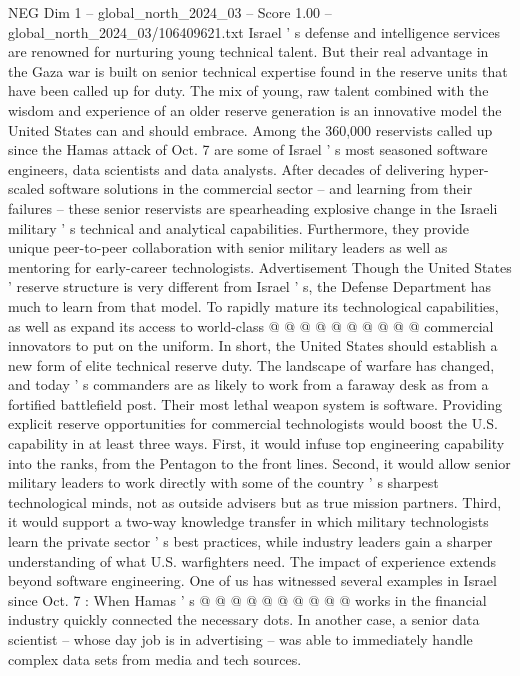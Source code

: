 \begin{textsample}{NEG Dim 1 – global\_north\_2024\_03 – Score 1.00 – global\_north\_2024\_03/106409621.txt}  \label{ex:f1_neg_394}
Israel ' s defense and intelligence services are renowned for nurturing young technical talent.
But their real advantage in the Gaza war is built on senior technical expertise found in the reserve units that have been called up for duty.
The mix of young, raw talent combined with the wisdom and experience of an older reserve generation is an innovative model the United States can and should embrace.
Among the 360,000 reservists called up since the Hamas attack of Oct. 7 are some of Israel ' s most seasoned software engineers, data scientists and data analysts.
After decades of delivering hyper-scaled software solutions in the commercial sector -- and learning from their failures -- these senior reservists are spearheading explosive change in the Israeli military ' s technical and analytical capabilities.
Furthermore, they provide unique peer-to-peer collaboration with senior military leaders as well as mentoring for early-career technologists.
Advertisement Though the United States ' reserve structure is very different from Israel ' s, the Defense Department has much to learn from that model.
To rapidly mature its technological capabilities, as well as expand its access to world-class @ @ @ @ @ @ @ @ @ @ commercial innovators to put on the uniform.
In short, the United States should establish a new form of elite technical reserve duty.
The landscape of warfare has changed, and today ' s commanders are as likely to work from a faraway desk as from a fortified battlefield post.
Their most lethal weapon system is software.
Providing explicit reserve opportunities for commercial technologists would boost the U.S. capability in at least three ways.
First, it would infuse top engineering capability into the ranks, from the Pentagon to the front lines.
Second, it would allow senior military leaders to work directly with some of the country ' s sharpest technological minds, not as outside advisers but as true mission partners.
Third, it would support a two-way knowledge transfer in which military technologists learn the private sector ' s best practices, while industry leaders gain a sharper understanding of what U.S. warfighters need.
The impact of experience extends beyond software engineering.
One of us has witnessed several examples in Israel since Oct. 7 : When Hamas ' s @ @ @ @ @ @ @ @ @ @ works in the financial industry quickly connected the necessary dots.
In another case, a senior data scientist -- whose day job is in advertising -- was able to immediately handle complex data sets from media and tech sources.

\end{textsample}
